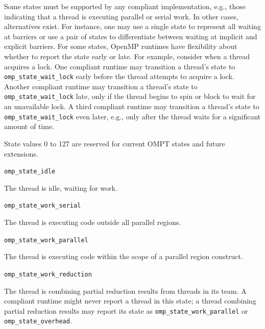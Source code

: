 \documentclass{article}
\newcommand{\descheader}[1]{{\needspace{3\baselineskip}\vspace{1em}\noindent \fbox{#1}}}
\begin{document}
Some states must be supported by any compliant implementation, e.g., those indicating that a thread is executing parallel or serial work. In other cases, alternatives exist. For instance, one may use a single state to represent all waiting at barriers or use a pair of states to differentiate between waiting at implicit and explicit barriers.
For some states, OpenMP runtimes have flexibility about whether to report the state early or late.
For example, consider when a thread acquires a lock. One
compliant runtime may transition a thread's state to 
\lstinline|omp_state_wait_lock|  early before the thread attempts to acquire a
lock. Another compliant runtime may transition a thread's state to
\lstinline|omp_state_wait_lock| late, only if the thread begins to spin or
block to wait for an unavailable lock. A third compliant runtime
may transition a thread's state to \lstinline|omp_state_wait_lock| even later, e.g., only
after the thread waits for a significant amount of time. 

State values 0 to 127 are reserved for current OMPT states and future extensions.  

\descheader{Idle State}

\begin{description}
\item \lstinline|omp_state_idle| 

  The thread is idle, waiting for work.
\end{description}

\descheader{Work States}

\begin{description}

\item \lstinline|omp_state_work_serial| 

  The thread is executing code outside all parallel regions. 

\item \lstinline|omp_state_work_parallel| 

  The thread is executing code within the scope of a parallel region construct.

\sloppy
\item \lstinline|omp_state_work_reduction| 

  The thread is combining partial reduction results from threads in its team. A compliant
  runtime might never report a thread in this state; a thread
  combining partial reduction results may  report its state as
  \lstinline|omp_state_work_parallel| or \lstinline|omp_state_overhead|.

\end{description}
\end{document}
